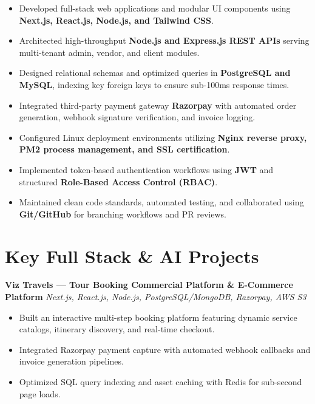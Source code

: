 \documentclass[a4paper,10pt]{article}
\begin{document}
\begin{itemize}

    \item Developed full-stack web applications and modular UI components using \textbf{Next.js, React.js, Node.js, and Tailwind CSS}.

    \item Architected high-throughput \textbf{Node.js and Express.js REST APIs} serving multi-tenant admin, vendor, and client modules.

    \item Designed relational schemas and optimized queries in \textbf{PostgreSQL and MySQL}, indexing key foreign keys to ensure sub-100ms response times.

    \item Integrated third-party payment gateway \textbf{Razorpay} with automated order generation, webhook signature verification, and invoice logging.

    \item Configured Linux deployment environments utilizing \textbf{Nginx reverse proxy, PM2 process management, and SSL certification}.

    \item Implemented token-based authentication workflows using \textbf{JWT} and structured \textbf{Role-Based Access Control (RBAC)}.

    \item Maintained clean code standards, automated testing, and collaborated using \textbf{Git/GitHub} for branching workflows and PR reviews.

\end{itemize}

\section*{Key Full Stack & AI Projects}

\textbf{Viz Travels --- Tour Booking Commercial Platform \& E-Commerce Platform}
\hfill
\textit{Next.js, React.js, Node.js, PostgreSQL/MongoDB, Razorpay, AWS S3}

\begin{itemize}

    \item Built an interactive multi-step booking platform featuring dynamic service catalogs, itinerary discovery, and real-time checkout.

    \item Integrated Razorpay payment capture with automated webhook callbacks and invoice generation pipelines.

    \item Optimized SQL query indexing and asset caching with Redis for sub-second page loads.

\end{itemize}
\end{document}
